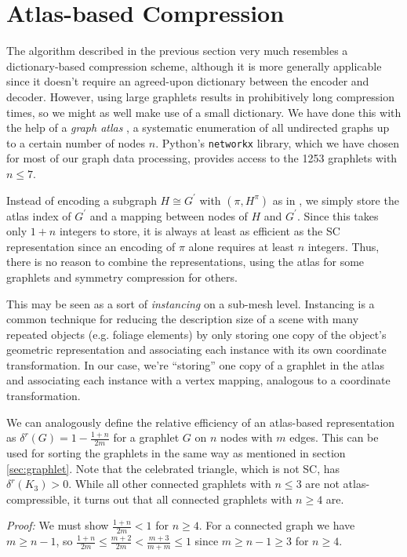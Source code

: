 \documentclass{egpubl}
\begin{document}
\section{Atlas-based Compression}

The algorithm described in the previous section very much resembles a dictionary-based compression scheme, although it is more generally applicable since it doesn't require an agreed-upon dictionary between the encoder and decoder. However, using large graphlets results in prohibitively long compression times, so we might as well make use of a small dictionary.
We have done this with the help of a \textit{graph atlas} \cite{read1998atlas}, a systematic enumeration of all undirected graphs up to a certain number of nodes $n$. Python's \texttt{networkx} library, which we have chosen for most of our graph data processing, provides access to the 1253 graphlets with $n \leq 7$.

Instead of encoding a subgraph $H \cong G^\prime$ with $(\pi, H^\pi)$ as in \cite[Algorithm 1]{cibej2021automorphisms}, we simply store the atlas index of $G^\prime$ and a mapping between nodes of $H$ and $G^\prime$.
Since this takes only $1 + n$ integers to store, it is always at least as efficient as the SC representation since an encoding of $\pi$ alone requires at least $n$ integers.
Thus, there is no reason to combine the representations, using the atlas for some graphlets and symmetry compression for others.

This may be seen as a sort of \textit{instancing} on a sub-mesh level. Instancing is a common technique for reducing the description size of a scene with many repeated objects (e.g. foliage elements) by only storing one copy of the object's geometric representation and associating each instance with its own coordinate transformation. In our case, we're ``storing'' one copy of a graphlet in the atlas and associating each instance with a vertex mapping, analogous to a coordinate transformation.

We can analogously define the relative efficiency of an atlas-based representation as
$\delta^r(G) = 1 - \frac{1+n}{2m}$ for a graphlet $G$ on $n$ nodes with $m$ edges. This can be used for sorting the graphlets in the same way as mentioned in section \ref{sec:graphlet}.
Note that the celebrated triangle, which is not SC, has $\delta^r(K_3) > 0$.
While all other connected graphlets with $n \leq 3$ are not atlas-compressible, it turns out that all connected graphlets with $n \geq 4$ are.

\textit{Proof:}
We must show $\frac{1 + n}{2m} < 1$ for $n \geq 4$. For a connected graph we have $m \geq n - 1$, so $\frac{1 + n}{2m} \leq \frac{m + 2}{2m} < \frac{m + 3}{m + m} \leq 1$ since $m \geq n - 1 \geq 3$ for $n \geq 4$.
\end{document}
